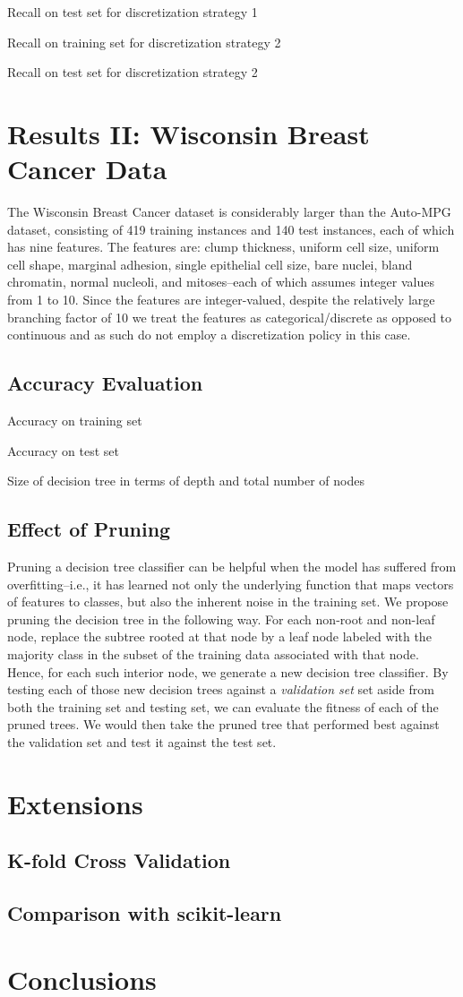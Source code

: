 \documentclass[12pt, conference, compsocconf]{IEEEtran}
\begin{document}
Recall on test set for discretization strategy 1

Recall on training set for discretization strategy 2

Recall on test set for discretization strategy 2

\section{Results II: Wisconsin Breast Cancer Data}
The Wisconsin Breast Cancer dataset is considerably larger than the Auto-MPG dataset, consisting of 419 training instances and 140 test instances, each of which has nine features. 
The features are: clump thickness, uniform cell size, uniform cell shape, marginal adhesion, single epithelial cell size, bare nuclei, bland chromatin, normal nucleoli, and mitoses--each of which assumes integer values from 1 to 10. 
Since the features are integer-valued, despite the relatively large branching factor of 10 we treat the features as categorical/discrete as opposed to continuous and as such do not employ a discretization policy in this case. 

\subsection{Accuracy Evaluation}
Accuracy on training set

Accuracy on test set

Size of decision tree in terms of depth and total number of nodes

\subsection{Effect of Pruning}
Pruning a decision tree classifier can be helpful when the model has suffered from overfitting--i.e., it has learned not only the underlying function that maps vectors of features to classes, but also the inherent noise in the training set. 
We propose pruning the decision tree in the following way. 
For each non-root and non-leaf node, replace the subtree rooted at that node by a leaf node labeled with the majority class in the subset of the training data associated with that node. 
Hence, for each such interior node, we generate a new decision tree classifier.
By testing each of those new decision trees against a \emph{validation set} set aside from both the training set and testing set, we can evaluate the fitness of each of the pruned trees. 
We would then take the pruned tree that performed best against the validation set and test it against the test set. 

\section{Extensions}

\subsection{K-fold Cross Validation}

\subsection{Comparison with scikit-learn}

\section{Conclusions}

%
%
\end{document}
